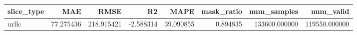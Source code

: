\begin{tabular}{lrrrrrrr}
\toprule
slice_type & MAE & RMSE & R2 & MAPE & mask_ratio & num_samples & num_valid \\
\midrule
urllc & 77.275436 & 218.915421 & -2.588314 & 39.090855 & 0.894835 & 133600.000000 & 119550.000000 \\
\bottomrule
\end{tabular}
